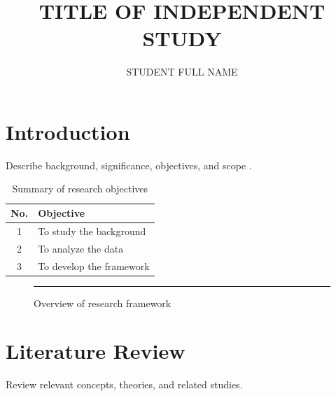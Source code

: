 \documentclass{muthesis2026}
\title{TITLE OF INDEPENDENT STUDY}
\author{STUDENT FULL NAME}
\begin{document}
\maketitle



\tableofcontents
\listoftables
\listoffigures
{}


\chapter{Introduction}
Describe background, significance, objectives, and scope \cite{mount2004bioinformatics}.

\begin{table}[h]
\centering
\caption{Summary of research objectives}
\begin{tabular}{cl}
\hline
No. & Objective \\
\hline
1 & To study the background \\
2 & To analyze the data \\
3 & To develop the framework \\
\hline
\end{tabular}
\end{table}

\begin{figure}[h]
\centering
\rule{6cm}{4cm}
\caption{Overview of research framework}
\end{figure}

\chapter{Literature Review}
Review relevant concepts, theories, and related studies.
\end{document}

